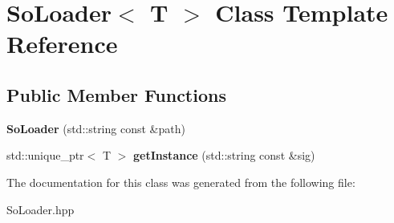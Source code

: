 \hypertarget{class_so_loader}{}\section{So\+Loader$<$ T $>$ Class Template Reference}
\label{class_so_loader}
\subsection*{Public Member Functions}
\begin{DoxyCompactItemize}
\item 
\mbox{\label{class_so_loader_ac264d4efbb81c5c84dabf1ab006e6f14}} 
{\bfseries So\+Loader} (std\+::string const \&path)
\item 
\mbox{\label{class_so_loader_a44c48b8db054fb70c296896872945c2f}} 
std\+::unique\+\_\+ptr$<$ T $>$ {\bfseries get\+Instance} (std\+::string const \&sig)
\end{DoxyCompactItemize}


The documentation for this class was generated from the following file\+:\begin{DoxyCompactItemize}
\item 
So\+Loader.\+hpp\end{DoxyCompactItemize}
